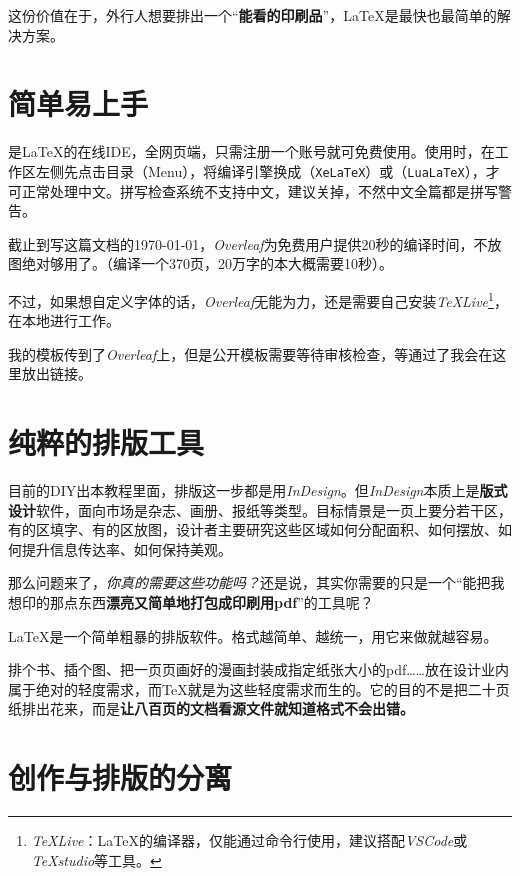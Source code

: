 \documentclass[10pt,openany]{book}
\begin{document}
\begin{sloppypar}
    这份价值在于，外行人想要排出一个“\textbf{能看的印刷品}”，{\LaTeX}是最快也最简单的解决方案。

    \section{简单易上手}

    是{\LaTeX}的在线IDE，全网页端，只需注册一个账号就可免费使用。使用时，在工作区左侧先点击目录（Menu），将编译引擎换成{\XeLaTeX}（\texttt{XeLaTeX}）或{\LuaLaTeX}（\texttt{LuaLaTeX}），才可正常处理中文。拼写检查系统不支持中文，建议关掉，不然中文全篇都是拼写警告。

    截止到写这篇文档的\today，\emph{Overleaf}为免费用户提供20秒的编译时间，不放图绝对够用了。（编译一个370页，20万字的本大概需要10秒）。

    不过，如果想自定义字体的话，\emph{Overleaf}无能为力，还是需要自己安装\emph{TeXLive}\footnote{\emph{TeXLive}：{\LaTeX}的编译器，仅能通过命令行使用，建议搭配\emph{VSCode}或\emph{TeXstudio}等工具。}，在本地进行工作。

    我的模板传到了\emph{Overleaf}上，但是公开模板需要等待审核检查，等通过了我会在这里放出链接。

    \section{纯粹的排版工具}

    目前的DIY出本教程里面，排版这一步都是用\emph{InDesign}。但\emph{InDesign}本质上是\textbf{版式设计}软件，面向市场是杂志、画册、报纸等类型。目标情景是一页上要分若干区，有的区填字、有的区放图，设计者主要研究这些区域如何分配面积、如何摆放、如何提升信息传达率、如何保持美观。

    那么问题来了，\emph{你真的需要这些功能吗？}还是说，其实你需要的只是一个“能把我想印的那点东西\textbf{漂亮又简单地打包成印刷用pdf}”的工具呢？

    {\LaTeX}是一个简单粗暴的排版软件。格式越简单、越统一，用它来做就越容易。

    排个书、插个图、把一页页画好的漫画封装成指定纸张大小的pdf……放在设计业内属于绝对的轻度需求，而{\TeX}就是为这些轻度需求而生的。它的目的不是把二十页纸排出花来，而是\textbf{让八百页的文档看源文件就知道格式不会出错。}

    \section{创作与排版的分离}


\end{sloppypar}
\end{document}
